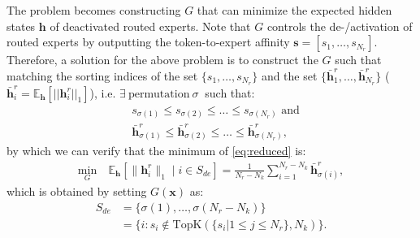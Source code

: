 The problem becomes constructing $G$ that can minimize the expected hidden states $\mathbf{h}$ of deactivated routed experts.
Note that $G$ controls the de-/activation of routed experts by outputting the token-to-expert affinity $\mathbf{s} = [s_1,\dots,s_{N_r}]$.
Therefore, a solution for the above problem is to construct the $G$ such that matching the sorting indices of the set $\{s_1, \dots, s_{N_r} \}$ and the set $\{\bar{\mathbf{h}}^r_1, \dots, \bar{\mathbf{h}}^r_{N_r}\}$ ($\bar{\mathbf{h}}^r_i = \mathbb{E}_{\mathbf{h}}\left[ || \mathbf{h}^r_i ||_1\right]$), i.e. $\exists\ \text{permutation}\ \sigma \ $ such that:
\begin{align}
\label{eq:permu}
    &s_{\sigma(1)} \leq s_{\sigma(2)} \leq \dots \leq s_{\sigma(N_r)} \mbox{ and}\nonumber \\
    & \bar{\mathbf{h}}^r_{\sigma(1)} \leq \bar{\mathbf{h}}^r_{\sigma(2)} \leq \dots \leq \bar{\mathbf{h}}^r_{\sigma(N_r)},
\end{align}
by which we can verify that the minimum of \eqref{eq:reduced} is:
\begin{align}
    \min_{G}\ &\mathbb{E}_{\mathbf{h}}\left[ \| \mathbf{h}^r_i \|_1 \mid i \in S_{de} \right] = \frac{1}{N_r-N_k}\!\!\sum_{i=1}^{N_r-N_k} \bar{\mathbf{h}}^r_{\sigma(i)},
\end{align}
which is obtained by setting $G(\mathbf{x})$ as:
\begin{align}
    S_{de} &= \{\sigma(1), \dots , \sigma(N_r-N_k)\} \nonumber\\
           &= \{i: s_i \notin \text{TopK}(\{s_i | 1\leq j\leq N_r\}, N_k)\}.
\end{align}

